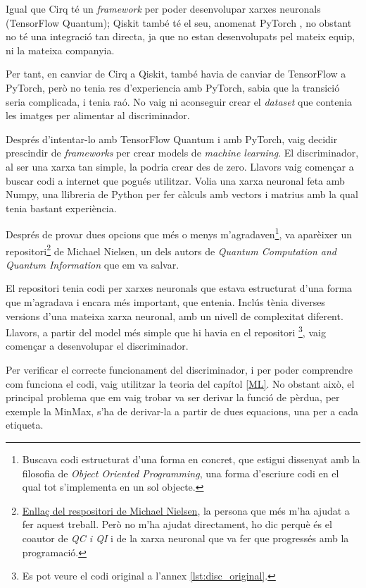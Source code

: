 Igual que Cirq té un \textit{framework} per poder desenvolupar xarxes neuronals (TensorFlow Quantum); Qiskit també té el seu, anomenat PyTorch \cite{pytorch_2019}, no obstant no té una integració tan directa, ja que no estan desenvolupats pel mateix equip, ni la mateixa companyia.

Per tant, en canviar de Cirq a Qiskit, també havia de canviar de TensorFlow a PyTorch, però no tenia res d'experiencia amb PyTorch, sabia que la transició seria complicada, i tenia raó. No vaig ni aconseguir crear el \textit{dataset} que contenia les imatges per alimentar al discriminador.

Després d'intentar-lo amb TensorFlow Quantum i amb PyTorch, vaig decidir prescindir de \textit{frameworks} per crear models de \textit{machine learning}. El discriminador, al ser una xarxa tan simple, la podria crear des de zero. Llavors vaig començar a buscar codi a internet que pogués utilitzar. Volia una xarxa neuronal feta amb Numpy, una llibreria de Python per fer càlculs amb vectors i matrius amb la qual tenia bastant experiència.

Després de provar dues opcions que més o menys m'agradaven\footnote{Buscava codi estructurat d'una forma en concret, que estigui dissenyat amb la filosofia de \textit{Object Oriented Programming}, una forma d'escriure codi en el qual tot s'implementa en un sol objecte.}, va aparèixer un repositori\footnote{\href{https://github.com/mnielsen/neural-networks-and-deep-learning}{Enllaç del respositori de Michael Nielsen}, la persona que més m'ha ajudat a fer aquest treball. Però no m'ha ajudat directament, ho dic perquè és el coautor de \textit{QC i QI} \cite{QCandQI} i de la xarxa neuronal que va fer que progressés amb la programació. } de Michael Nielsen, un dels autors de \textit{Quantum Computation and Quantum Information} \cite{QCandQI} que em va salvar. 

El repositori tenia codi per xarxes neuronals que estava estructurat d'una forma que m'agradava i encara més important, que entenia. Inclús tènia diverses versions d'una mateixa xarxa neuronal, amb un nivell de complexitat diferent. Llavors, a partir del model més simple que hi havia en el repositori \footnote{Es pot veure el codi original a l'annex \ref{lst:disc_original}.}, vaig començar a desenvolupar el discriminador.

Per verificar el correcte funcionament del discriminador, i per poder comprendre com funciona el codi, vaig utilitzar la teoria del capítol \ref{ML}. No obstant això, el principal problema que em vaig trobar va ser derivar la funció de pèrdua, per exemple la MinMax, s'ha de derivar-la a partir de dues equacions, una per a cada etiqueta.


